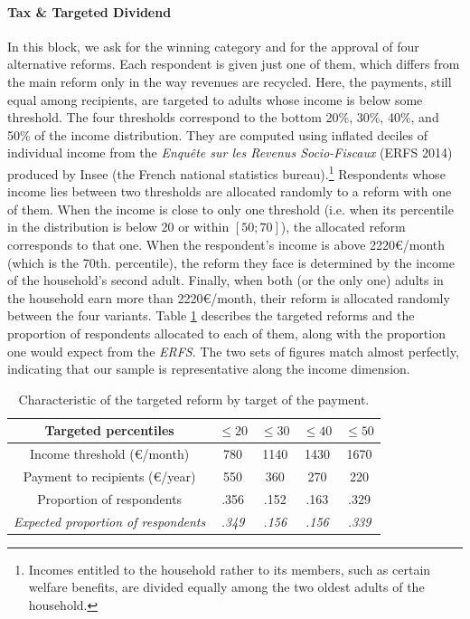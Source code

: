 \documentclass[12pt]{article} %
\begin{document}
\paragraph{Tax \& Targeted Dividend}
In this block, we ask for the winning category and for the approval of four alternative reforms. Each respondent is given just one of them, which differs from the main reform only in the way revenues are recycled. Here, the payments, still equal among recipients, are targeted to adults whose income is below some threshold. The four thresholds correspond to the bottom 20\%, 30\%, 40\%, and 50\% of the income distribution. They are computed using inflated deciles of individual income from the \emph{Enquête sur les Revenus Socio-Fiscaux }(ERFS 2014) produced by Insee (the French national statistics bureau).\footnote{Incomes entitled to the household rather to its members, such as certain welfare benefits, are divided equally among the two oldest adults of the household.} Respondents whose income lies between two thresholds are allocated randomly to a reform with one of them. When the income is close to only one threshold (i.e. when its percentile in the distribution is below 20 or within $\left[50;70\right]$), the allocated reform corresponds to that one. When the respondent's income is above 2220\euro{}/month (which is the 70th. percentile), the reform they face is determined by the income of the household's second adult. Finally, when both (or the only one) adults in the household earn more than 2220\euro{}/month, their reform is allocated randomly between the four variants. Table \ref{tab:Compensation-amount-by} describes the targeted reforms and the proportion of respondents allocated to each of them, along with the proportion one would expect from the \emph{ERFS}. The two sets of figures match almost perfectly, indicating that our sample is representative along the income dimension.


\begin{table}[H]
\caption{\label{tab:Compensation-amount-by}Characteristic of the targeted
reform by target of the payment.}
\centering%
\begin{tabular}{ccccc}
\hline 
\hline 
Targeted percentiles & $\leq20$ & $\leq30$ & $\leq40$ & $\leq50$\tabularnewline
\hline 
Income threshold (\euro{}/month) & 780 & 1140 & 1430 & 1670\tabularnewline
Payment to recipients (\euro{}/year) & 550 & 360 & 270 & 220\tabularnewline
Proportion of respondents & .356 & .152 & .163 & .329\tabularnewline
\emph{Expected proportion of respondents} & \emph{.349} & \emph{.156} & \emph{.156} & \emph{.339}\tabularnewline
\hline 
\hline 
\end{tabular}

\end{table}
\end{document}
